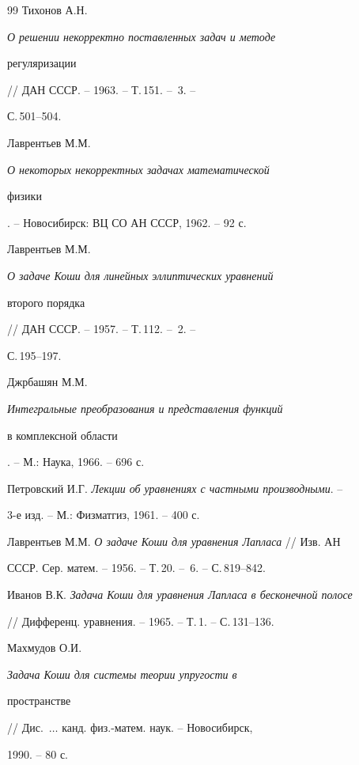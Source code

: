 \begin{thebibliography}{99}
Тихонов А.Н. {\em О решении некорректно поставленных задач и методе 


регуляризации} // ДАН СССР. -- 1963. -- Т.\,151. -- \No\,3. -- 


С.\,501--504. 




Лаврентьев М.М. {\em О некоторых некорректных задачах математической 


физики}. -- Новосибирск: ВЦ СО АН СССР, 1962. -- 92 с. 




Лаврентьев М.М. {\em О задаче Коши для линейных эллиптических уравнений 


второго порядка} // ДАН СССР. -- 1957. -- Т.\,112. -- \No\,2. -- 


С.\,195--197. 




Джрбашян М.М. {\em Интегральные преобразования и представления функций 


в комплексной области}. -- М.: Наука, 1966. -- 696 с. 




Петровский И.Г. {\em Лекции об уравнениях с частными производными}. -- 


3-е изд. -- М.: Физматгиз, 1961. -- 400 с. 




Лаврентьев М.М. {\em О задаче Коши для уравнения Лапласа} // Изв. АН 


СССР. Сер. матем. -- 1956. -- Т.\,20. -- \No\,6. -- С.\,819--842. 




Иванов В.К. {\em Задача Коши для уравнения Лапласа в бесконечной полосе} 


// Дифференц. уравнения. -- 1965. -- Т.\,1. -- С.\,131--136. 




Махмудов О.И. {\em Задача Коши для системы теории упругости в 


пространстве} // Дис.~$\dotsc$ канд. физ.-матем. наук. -- Новосибирск, 


1990. -- 80 с. 


 


 


\end{thebibliography} 


 


\vskip 2cm 


 






 


\label{end} 


 


